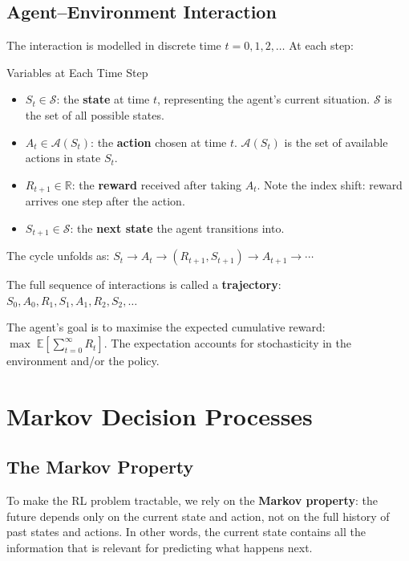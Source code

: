 \documentclass[11pt,a4paper]{article}
\newcommand{\R}{\mathbb{R}}
\newcommand{\E}{\mathbb{E}}
\newcommand{\term}[1]{\textcolor{DefGreen}{\textbf{#1}}}
\begin{document}
\subsection{Agent--Environment Interaction}

The interaction is modelled in discrete time $t = 0, 1, 2, \ldots$ At each step:

\begin{defbox}{Variables at Each Time Step}
\begin{itemize}
  \item $S_t \in \mathcal{S}$: the \textbf{state} at time $t$, representing the agent's current situation. $\mathcal{S}$ is the set of all possible states.
  \item $A_t \in \mathcal{A}(S_t)$: the \textbf{action} chosen at time $t$. $\mathcal{A}(S_t)$ is the set of available actions in state $S_t$.
  \item $R_{t+1} \in \R$: the \textbf{reward} received after taking $A_t$. Note the index shift: reward arrives one step after the action.
  \item $S_{t+1} \in \mathcal{S}$: the \textbf{next state} the agent transitions into.
\end{itemize}
\end{defbox}

The cycle unfolds as: $S_t \to A_t \to (R_{t+1}, S_{t+1}) \to A_{t+1} \to \cdots$

The full sequence of interactions is called a \term{trajectory}: $S_0, A_0, R_1, S_1, A_1, R_2, S_2, \ldots$

\begin{insightbox}[Objective]
The agent's goal is to maximise the expected cumulative reward:
$\max\;\E\!\left[\sum_{t=0}^{\infty} R_t\right]$.
The expectation accounts for stochasticity in the environment and/or the policy.
\end{insightbox}

\section{Markov Decision Processes}

\subsection{The Markov Property}

To make the RL problem tractable, we rely on the \term{Markov property}: the future depends only on the current state and action, not on the full history of past states and actions. In other words, the current state contains all the information that is relevant for predicting what happens next.
\end{document}
